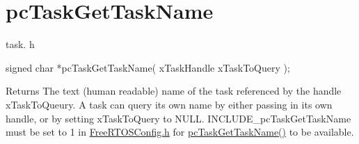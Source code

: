\hypertarget{group__pc_task_get_task_name}{}\section{pc\+Task\+Get\+Task\+Name}
\label{group__pc_task_get_task_name}
task. h 
\begin{DoxyPre}signed char *pcTaskGetTaskName( xTaskHandle xTaskToQuery );\end{DoxyPre}


\begin{DoxyReturn}{Returns}
The text (human readable) name of the task referenced by the handle x\+Task\+To\+Queury. A task can query its own name by either passing in its own handle, or by setting x\+Task\+To\+Query to N\+U\+LL. I\+N\+C\+L\+U\+D\+E\+\_\+pc\+Task\+Get\+Task\+Name must be set to 1 in \mbox{\hyperlink{_free_r_t_o_s_config_8h}{Free\+R\+T\+O\+S\+Config.\+h}} for \mbox{\hyperlink{task_8h_a9f1840f3a1d2527e76d301fc1a6aba37}{pc\+Task\+Get\+Task\+Name()}} to be available. 
\end{DoxyReturn}

